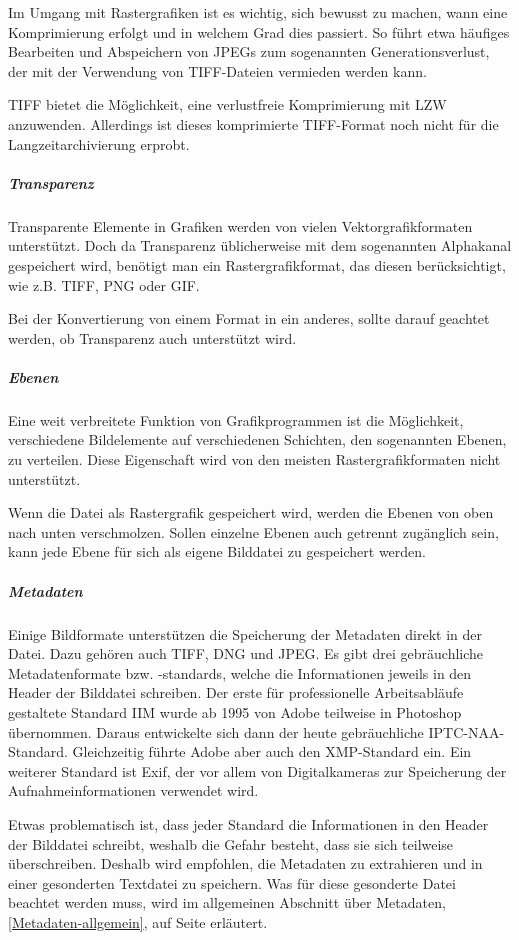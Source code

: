 Im Umgang mit Rastergrafiken ist es wichtig, sich bewusst zu machen, wann eine Komprimierung erfolgt und in welchem Grad dies passiert. So führt etwa häufiges Bearbeiten und Abspeichern von JPEGs zum sogenannten Generationsverlust, der mit der Verwendung von TIFF-Dateien vermieden werden kann.

TIFF bietet die Möglichkeit, eine verlustfreie Komprimierung mit LZW anzuwenden. Allerdings ist dieses komprimierte TIFF-Format noch nicht für die Langzeitarchivierung erprobt.


\subparagraph{Transparenz} Transparente Elemente in Grafiken werden von vielen Vektorgrafikformaten unterstützt. Doch da Transparenz üblicherweise mit dem sogenannten Alphakanal gespeichert wird, benötigt man ein Rastergrafikformat, das diesen berücksichtigt, wie z.B. TIFF, PNG oder GIF. 

Bei der Konvertierung von einem Format in ein anderes, sollte darauf geachtet werden, ob Transparenz auch unterstützt wird.


\subparagraph{Ebenen} Eine weit verbreitete Funktion von Grafikprogrammen ist die Möglichkeit, verschiedene Bildelemente auf verschiedenen Schichten, den sogenannten Ebenen, zu verteilen. Diese Eigenschaft wird von den meisten Rastergrafikformaten nicht unterstützt. 

Wenn die Datei als Rastergrafik gespeichert wird, werden die Ebenen von oben nach unten verschmolzen. Sollen einzelne Ebenen auch getrennt zugänglich sein, kann jede Ebene für sich als eigene Bilddatei zu gespeichert werden.

\subparagraph{Metadaten} Einige Bildformate unterstützen die Speicherung der Metadaten direkt in der Datei. Dazu gehören auch TIFF, DNG und JPEG. Es gibt drei gebräuchliche Metadatenformate bzw. -standards, welche die Informationen jeweils in den Header der Bilddatei schreiben. Der erste für professionelle Arbeitsabläufe gestaltete Standard IIM wurde ab 1995 von Adobe teilweise in Photoshop übernommen. Daraus entwickelte sich dann der heute gebräuchliche IPTC-NAA-Standard. Gleichzeitig führte Adobe aber auch den XMP-Standard ein. Ein weiterer Standard ist Exif, der vor allem von Digitalkameras zur Speicherung der Aufnahmeinformationen verwendet wird.

Etwas problematisch ist, dass jeder Standard die Informationen in den Header der Bilddatei schreibt, weshalb die Gefahr besteht, dass sie sich teilweise überschreiben. Deshalb wird empfohlen, die Metadaten zu extrahieren und in einer gesonderten Textdatei zu speichern. Was für diese gesonderte Datei beachtet werden muss, wird im allgemeinen Abschnitt über Metadaten, \ref{Metadaten-allgemein}, auf Seite \pageref{Metadaten-allgemein} erläutert.

